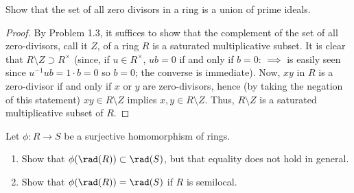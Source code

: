 \newpage
\begin{problem}
Show that the set of all zero divisors in a ring is a union of
prime ideals.
\end{problem}
\begin{proof}
By Problem 1.3, it suffices to show that the complement of the
set of all zero-divisors, call it $Z$, of a ring $R$ is a
saturated multiplicative subset. It is clear that $R\setminus
Z\supset R^\times$ (since, if $u\in R^\times$, $ub=0$ if and only
if $b=0$: $\implies$ is easily seen since $u^{-1}ub=1\cdot b=0$
so $b=0$; the converse is immediate). Now, $xy$ in $R$ is a
zero-divisor if and only if $x$ or $y$ are zero-divisors, hence
(by taking the negation of this statement) $xy\in R\setminus Z$
implies $x,y\in R\setminus Z$. Thus, $R\setminus Z$ is a
saturated multiplicative subset of $R$.
\end{proof}
\newpage
\begin{problem}
Let $\phi\colon R\to S$ be a surjective homomorphism of
rings.
\begin{enumerate}[noitemsep,label=(\alph*)]
\item Show that $\phi(\rad(R))\subset\rad(S)$, but that
  equality does not hold in general.
\item Show that $\phi(\rad(R))=\rad(S)$ if $R$ is semilocal.
\end{enumerate}
\end{problem}
